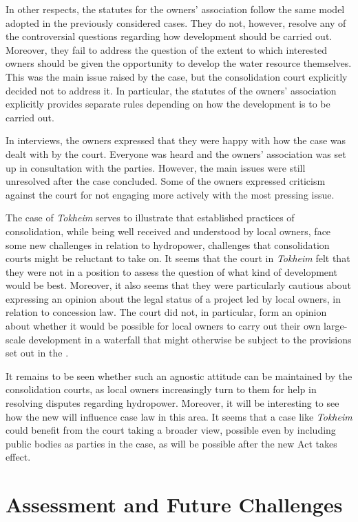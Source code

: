 In other respects, the statutes for the owners' association follow the same model adopted in the previously considered cases. They do not, however, resolve any of the controversial questions regarding how development should be carried out. Moreover, they fail to address the question of the extent to which interested owners should be given the opportunity to develop the water resource themselves. This was the main issue raised by the case, but the consolidation court explicitly decided not to address it. In particular, the statutes of the owners' association explicitly provides separate rules depending on how the development is to be carried out. 

In interviews, the owners expressed that they were happy with how the case was dealt with by the court. Everyone was heard and the owners' association was set up in consultation with the parties. However, the main issues were still unresolved after the case concluded. Some of the owners expressed criticism against the court for not engaging more actively with the most pressing issue.

The case of \emph{Tokheim} serves to illustrate that established practices of consolidation, while being well received and understood by local owners, face some new challenges in relation to hydropower, challenges that consolidation courts might be reluctant to take on. It seems that the court in \emph{Tokheim} felt that they were not in a position to assess the question of what kind of development would be best. Moreover, it also seems that they were particularly cautious about expressing an opinion about the legal status of a project led by local owners, in relation to concession law. The court did not, in particular, form an opinion about whether it would be possible for local owners to carry out their own large-scale development in a waterfall that might otherwise be subject to the provisions set out in the \cite{ica17}.

It remains to be seen whether such an agnostic attitude can be maintained by the consolidation courts, as local owners increasingly turn to them for help in resolving disputes regarding hydropower. Moreover, it will be interesting to see how the new \cite{lca13} will influence case law in this area. It seems that a case like \emph{Tokheim} could benefit from the court taking a broader view, possible even by including public bodies as parties in the case, as will be possible after the new Act takes effect.

\section{Assessment and Future Challenges}\label{sec:lca}

